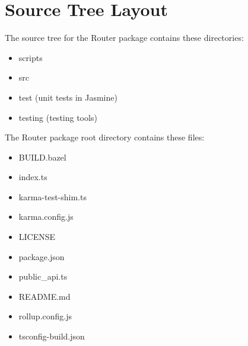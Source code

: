 \section{Source Tree Layout}

The source tree for the Router package contains these directories:

\begin{itemize}
  \item scripts
  \item src
  \item test (unit tests in Jasmine)
  \item testing (testing tools)
\end{itemize}

The Router package root directory contains these files:

\begin{itemize}
  \item BUILD.bazel
  \item index.ts
  \item karma-test-shim.ts
  \item karma.config.js
  \item LICENSE
  \item package.json
  \item public\_api.ts
  \item README.md
  \item rollup.config.js
  \item tsconfig-build.json
\end{itemize}
